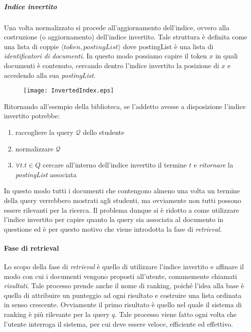 \subparagraph{Indice invertito}
Una volta normalizzato si procede all'aggiornamento dell'indice, ovvero alla costruzione (o aggiornamento)
dell'indice invertito. Tale struttura è definita come una lista di coppie
$\langle token, postingList \rangle$ dove postingList è una lista di \textit{identificatori di documenti}.
In questo modo possiamo capire il token $x$ in quali documenti è contenuto, cercando dentro l'indice
invertito la posizione di $x$ e accedendo alla sua \textit{postingList}.

\begin{figure}[h]
	\label{fig:invertedIndex}
	\centering
	\texttt{[image: InvertedIndex.eps]}
\end{figure}

\pagebreak

Ritornando all'esempio della biblioteca, se l'addetto avesse a disposizione l'indice invertito potrebbe:
\begin{enumerate}
	\item raccogliere la query $\mathcal{Q}$ dello studente
	\item normalizzare $\mathcal{Q}$
	\item $\forall t.t\in Q$ cercare all'interno dell'indice invertito il termine $t$ e \textit{ritornare} la \textit{postingList} associata
\end{enumerate}

In questo modo tutti i documenti che contengono almeno una volta un termine della query verrebbero mostrati
agli studenti, ma ovviamente non tutti possono essere rilevanti per la ricerca. Il problema dunque si è ridotto
a come utilizzare l'indice invertito per capire quanto la query sia associata al documento in questione ed è per questo
motivo che viene introdotta la fase di \textit{retrieval}.

\paragraph{Fase di retrieval}
Lo scopo della fase di \textit{retrieval} è quello di utilizzare l'indice invertito e affinare il modo con cui
i documenti vengono proposti all'utente, comunemente chiamati \textit{risultati}.
Tale processo prende anche il nome di ranking, poiché l'idea alla base è quella di attribuire
un punteggio ad ogni risultato e costruire una lista ordinata in senso crescente.
Ovviamente il primo risultato è quello nel quale il sistema di ranking è più
rilevante per la query $q$. Tale processo viene fatto ogni volta che l'utente
interroga il sistema, per cui deve essere veloce, efficiente ed effettivo.

